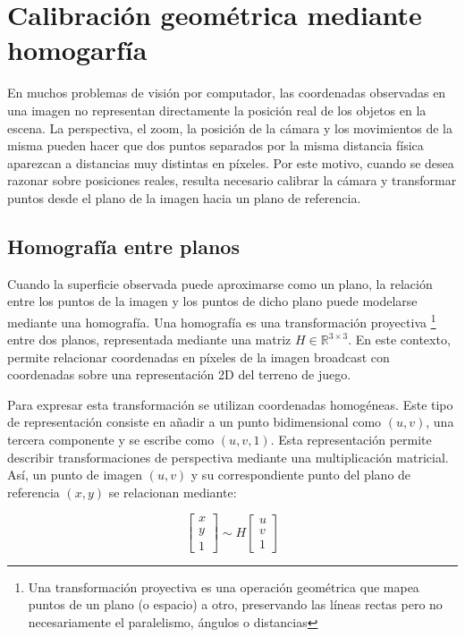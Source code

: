 \section{Calibración geométrica mediante homogarfía}
\label{sec:homografia-tecnologias}
En muchos problemas de visión por computador, las coordenadas observadas en una imagen no representan directamente la posición real de los objetos en la escena. La perspectiva, el zoom, la posición de la cámara y los movimientos de la misma pueden hacer que dos puntos separados por la misma distancia física aparezcan a distancias muy distintas en píxeles. Por este motivo, cuando se desea razonar sobre posiciones reales, resulta necesario calibrar la cámara y transformar puntos desde el plano de la imagen hacia un plano de referencia.

\subsection{Homografía entre planos}

Cuando la superficie observada puede aproximarse como un plano, la relación entre los puntos de la imagen y los puntos de dicho plano puede modelarse mediante una homografía. Una homografía es una transformación proyectiva \footnote{Una transformación proyectiva es una operación geométrica que mapea puntos de un plano (o espacio) a otro, preservando las líneas rectas pero no necesariamente el paralelismo, ángulos o distancias} entre dos planos, representada mediante una matriz $H \in \mathbb{R}^{3 \times 3}$. En este contexto, permite relacionar coordenadas en píxeles de la imagen broadcast con coordenadas sobre una representación 2D del terreno de juego.

Para expresar esta transformación se utilizan coordenadas homogéneas. Este tipo de representación consiste en añadir a un punto bidimensional como $(u,v)$, una tercera componente y se escribe como $(u,v,1)$. Esta representación permite describir transformaciones de perspectiva mediante una multiplicación matricial. Así, un punto de imagen $(u,v)$ y su correspondiente punto del plano de referencia $(x,y)$ se relacionan mediante:

\[
\begin{bmatrix}
x \\
y \\
1
\end{bmatrix}
\sim
H
\begin{bmatrix}
u \\
v \\
1
\end{bmatrix}
\]


